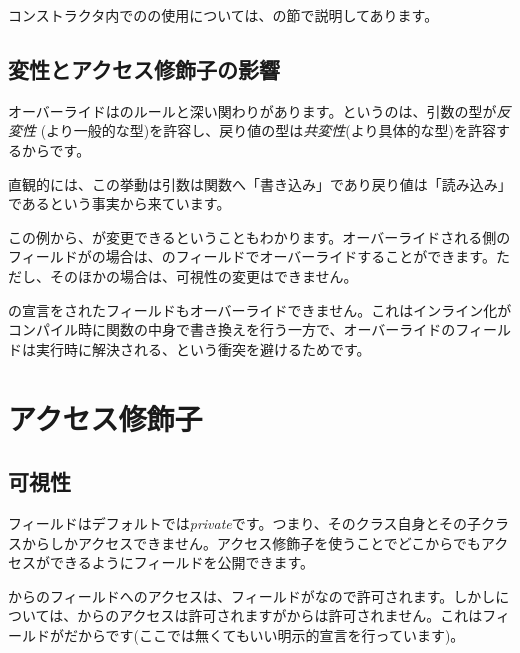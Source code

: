 
コンストラクタ内でのの使用については、の節で説明してあります。

\subsection{変性とアクセス修飾子の影響}
\label{class-field-override-effects}

オーバーライドはのルールと深い関わりがあります。というのは、引数の型が\emph{反変性} (より一般的な型)を許容し、戻り値の型は\emph{共変性}(より具体的な型)を許容するからです。


直観的には、この挙動は引数は関数へ「書き込み」であり戻り値は「読み込み」であるという事実から来ています。

この例から、が変更できるということもわかります。オーバーライドされる側のフィールドがの場合は、のフィールドでオーバーライドすることができます。ただし、そのほかの場合は、可視性の変更はできません。

の宣言をされたフィールドもオーバーライドできません。これはインライン化がコンパイル時に関数の中身で書き換えを行う一方で、オーバーライドのフィールドは実行時に解決される、という衝突を避けるためです。	
	
\section{アクセス修飾子}
\label{class-field-access-modifier}

\subsection{可視性}
\label{class-field-visibility}

フィールドはデフォルトでは\emph{private}です。つまり、そのクラス自身とその子クラスからしかアクセスできません。アクセス修飾子を使うことでどこからでもアクセスができるようにフィールドを公開できます。


からのフィールドへのアクセスは、フィールドがなので許可されます。しかしについては、からのアクセスは許可されますがからは許可されません。これはフィールドがだからです(ここでは無くてもいい明示的宣言を行っています)。

